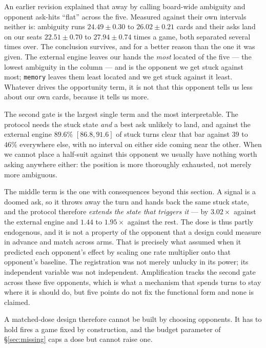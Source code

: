 \documentclass[11pt,letterpaper]{article}
\begin{document}
An earlier revision explained that away by calling board-wide ambiguity and
opponent ask-hits ``flat'' across the five. Measured against their own
intervals neither is: ambiguity runs $24.49 \pm 0.30$ to $26.02 \pm 0.21$
cards and their asks land on our seats $22.51 \pm 0.70$ to $27.94 \pm 0.74$
times a game, both separated several times over. The conclusion survives, and
for a better reason than the one it was given. The external engine leaves our
hands the \emph{most} located of the five --- the lowest ambiguity in the
column --- and is the opponent we get stuck against most; \texttt{memory}
leaves them least located and we get stuck against it least. Whatever drives
the opportunity term, it is not that this opponent tells us less about our own
cards, because it tells us more.

The second gate is the largest single term and the most interpretable. The
protocol needs the stuck state \emph{and} a best ask unlikely to land, and
against the external engine $89.6\%$ $[86.8, 91.6]$ of stuck turns clear that
bar against $39$ to $46\%$ everywhere else, with no interval on either side
coming near the other. When we cannot place a half-suit against this opponent
we usually have nothing worth asking anywhere either: the position is more
thoroughly exhausted, not merely more ambiguous.

The middle term is the one with consequences beyond this section. A signal is
a doomed ask, so it throws away the turn and hands back the same stuck state,
and the protocol therefore \emph{extends the state that triggers it} --- by
$3.02\times$ against the external engine and $1.44$ to $1.95\times$ against
the rest. The dose is thus partly endogenous, and it is not a property of the
opponent that a design could measure in advance and match across arms. That is
precisely what  assumed when it predicted
each opponent's effect by scaling one rate multiplier onto that opponent's
baseline. The registration was not merely unlucky in its power; its
independent variable was not independent. Amplification tracks the second gate
across these five opponents, which is what a mechanism that spends turns to
stay where it is should do, but five points do not fix the functional form and
none is claimed.

A matched-dose design therefore cannot be built by choosing opponents. It has
to hold fires a game fixed by construction, and the budget parameter of
\S\ref{sec:missing} caps a dose but cannot raise one.
\end{document}
